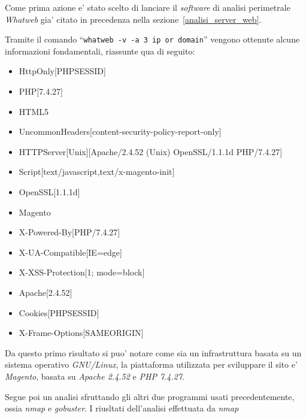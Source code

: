 \documentclass[a4paper]{report}
\newcommand{\quotes}[1]{``#1''}
\begin{document}
		Come prima azione e' stato scelto di lanciare il \emph{software} di analisi perimetrale \emph{Whatweb} gia'
		citato in precedenza nella sezione~\ref{analisi_server_web}.

		Tramite il comando \quotes{\texttt{whatweb -v -a 3 ip or domain}}
		vengono ottenute alcune informazioni fondamentali, riassunte qua di seguito:
		\begin{itemize}
			\item HttpOnly[PHPSESSID]
			\item PHP[7.4.27]
			\item HTML5
			\item UncommonHeaders[content-security-policy-report-only]
			\item HTTPServer[Unix][Apache/2.4.52 (Unix) OpenSSL/1.1.1d PHP/7.4.27]
			\item Script[text/javascript,text/x-magento-init]
			\item OpenSSL[1.1.1d]
			\item Magento
			\item X-Powered-By[PHP/7.4.27]
			\item X-UA-Compatible[IE=edge]
			\item X-XSS-Protection[1; mode=block]
			\item Apache[2.4.52]
			\item Cookies[PHPSESSID]
			\item X-Frame-Options[SAMEORIGIN]
		\end{itemize}
		Da questo primo risultato si puo' notare come sia un infrastruttura basata su un sistema operativo
		\emph{GNU/Linux}, la piattaforma utilizzata per sviluppare il sito e' \emph{Magento}, basata su \emph{Apache
		2.4.52} e \emph{PHP 7.4.27}.

		Segue poi un analisi sfruttando gli altri due programmi usati precedentemente, ossia \emph{nmap} e
		\emph{gobuster}.
		I riusltati dell'analisi effettuata da \emph{nmap} 
\end{document}
